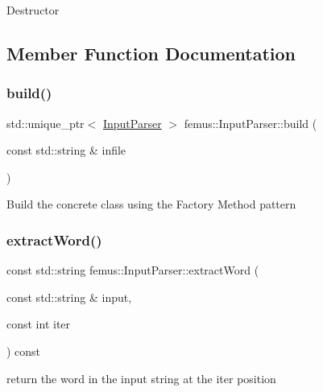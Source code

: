 Destructor 

\subsection{Member Function Documentation}
\mbox{\label{classfemus_1_1_input_parser_af074bd4cfd9b026191f9ffe3c2ce7f54}} 
\subsubsection{\texorpdfstring{build()}{build()}}
{\footnotesize\ttfamily std\+::unique\+\_\+ptr$<$ \mbox{\hyperlink{classfemus_1_1_input_parser}{Input\+Parser}} $>$ femus\+::\+Input\+Parser\+::build (\begin{DoxyParamCaption}\item[{const std\+::string \&}]{infile }\end{DoxyParamCaption})\hspace{0.3cm}{\ttfamily [static]}}

Build the concrete class using the Factory Method pattern \mbox{\label{classfemus_1_1_input_parser_af7cbe7caf86b9ec61d30fee4ca26b0f7}} 
\subsubsection{\texorpdfstring{extract\+Word()}{extractWord()}}
{\footnotesize\ttfamily const std\+::string femus\+::\+Input\+Parser\+::extract\+Word (\begin{DoxyParamCaption}\item[{const std\+::string \&}]{input,  }\item[{const int}]{iter }\end{DoxyParamCaption}) const\hspace{0.3cm}{\ttfamily [protected]}}

return the word in the input string at the {\ttfamily iter} position \mbox{\label{classfemus_1_1_input_parser_a7249522721ec07de009ffd04286847c5}} 
